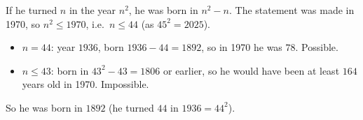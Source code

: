 If he turned $n$ in the year $n^2$, he was born in $n^2-n$. The statement was made in 1970, so $n^2\le1970$, i.e.\ $n\le44$ (as $45^2=2025$).
\begin{itemize}
\item $n=44$: year $1936$, born $1936-44=1892$, so in 1970 he was $78$. Possible.
\item $n\le43$: born in $43^2-43=1806$ or earlier, so he would have been at least $164$ years old in 1970. Impossible.
\end{itemize}
So he was born in $\boxed{1892}$ (he turned $44$ in $1936=44^2$).
